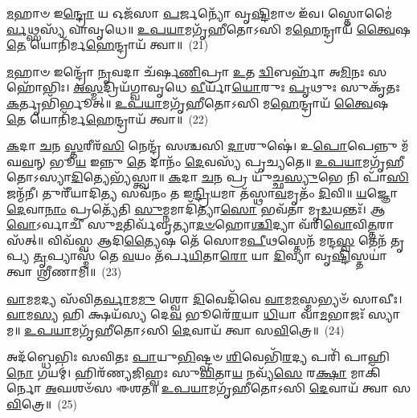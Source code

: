 \-\ul{𑌮}\-𑌹𑌾𑍞 𑌇\-\ul{𑌨𑍍𑌦𑍍𑌰𑍋} 𑌯 𑌓𑌜᳴𑌸𑌾 \ul{𑌪}\-𑌰𑍍𑌜𑌨𑍍𑌯𑍋᳴ 𑌵𑍃\-\ul{𑌷𑍍𑌟𑌿}\-𑌮𑌾𑍞 𑌇᳴𑌵। 𑌸𑍍𑌤𑍋𑌮𑍈॑\-\ul{𑌰𑍍𑌵}\-𑌥𑍍𑌸𑌸𑍍𑌯᳴ 𑌵𑌾𑌵𑍃𑌧𑍇॥ \ul{𑌉}\-\-\ul{𑌪}\-\-\ul{𑌯𑌾}\-𑌮𑌗𑍃᳴𑌹𑍀𑌤𑍋\-𑌽𑌸𑌿 𑌮\-\ul{𑌹𑍇}\-𑌨𑍍𑌦𑍍𑌰𑌾𑌯᳴ \ul{𑌤𑍍𑌵𑍈}\-𑌷 \ul{𑌤𑍇} 𑌯𑍋𑌨𑌿᳴𑌰𑍍𑌮\-\ul{𑌹𑍇}\-𑌨𑍍𑌦𑍍𑌰𑌾𑌯᳴ 𑌤𑍍𑌵𑌾॥~(21)

{\anuvakamend[{\-\ul{𑌮}\-𑌹𑌾𑌨𑍇\-\ul{𑌕𑌾}\-𑌨𑍍𑌨𑌵𑌿𑍞᳴𑌶𑌤𑌿𑌃}]}%

\-\ul{𑌮}\-𑌹𑌾𑍞 𑌇𑌨𑍍𑌦𑍍𑌰𑍋᳴ \ul{𑌨𑍃}\-𑌵𑌦𑌾 𑌚᳴𑌰𑍍\mbox{}𑌷\-\ul{𑌣𑌿}\-𑌪𑍍𑌰𑌾 \ul{𑌉}\-𑌤 \ul{𑌦𑍍𑌵𑌿}\-𑌬𑌰𑍍\mbox{}𑌹𑌾᳴ 𑌅\-\ul{𑌮𑌿}\-𑌨𑌃 𑌸𑌹𑍋᳴𑌭𑌿𑌃। \ul{𑌅}\-\-\ul{𑌸𑍍𑌮}\-𑌦𑍍𑌰𑌿𑌯᳴𑌗𑍍𑌵𑌾𑌵𑍃𑌧𑍇 \ul{𑌵𑍀}\-𑌰𑍍𑌯𑌾᳴\-\ul{𑌯𑍋}\-𑌰𑍁𑌃 \ul{𑌪𑍃}\-𑌥𑍁𑌃 𑌸𑍁𑌕𑍃᳴𑌤𑌃 \ul{𑌕}\-𑌰𑍍𑌤𑍃𑌭𑌿᳴𑌰𑍍𑌭𑍂𑌤𑍍॥ \ul{𑌉}\-\-\ul{𑌪}\-\-\ul{𑌯𑌾}\-𑌮𑌗𑍃᳴𑌹𑍀𑌤𑍋\-𑌽𑌸𑌿 𑌮\-\ul{𑌹𑍇}\-𑌨𑍍𑌦𑍍𑌰𑌾𑌯᳴ \ul{𑌤𑍍𑌵𑍈}\-𑌷 \ul{𑌤𑍇} 𑌯𑍋𑌨𑌿᳴𑌰𑍍𑌮\-\ul{𑌹𑍇}\-𑌨𑍍𑌦𑍍𑌰𑌾𑌯᳴ 𑌤𑍍𑌵𑌾॥~(22)

{\anuvakamend[{\-\ul{𑌮}\-𑌹𑌾\-\ul{𑌨𑍍𑌨𑍃}\-𑌵𑌤𑍍𑌷𑌡𑍍𑌵𑌿𑍞᳴𑌶𑌤𑌿𑌃}]}%

\-\ul{𑌕}\-𑌦𑌾 \ul{𑌚}\-𑌨 \ul{𑌸𑍍𑌤}\-𑌰𑍀𑌰᳴\-\ul{𑌸𑌿} 𑌨𑍇𑌨𑍍𑌦𑍍𑌰᳴ 𑌸𑌶𑍍𑌚𑌸𑌿 \ul{𑌦𑌾}\-𑌶𑍁𑌷𑍇॑। 𑌉\-\ul{𑌪𑍋}\-𑌪𑍇𑌨𑍍𑌨𑍁 𑌮᳴𑌘\-\ul{𑌵}\-𑌨𑍍 𑌭𑍂\-\ul{𑌯} 𑌇𑌨𑍍𑌨𑍁 \ul{𑌤𑍇} 𑌦𑌾𑌨𑌂᳴ \ul{𑌦𑍇}\-𑌵𑌸𑍍𑌯᳴ 𑌪𑍃𑌚𑍍𑌯𑌤𑍇॥ \ul{𑌉}\-\-\ul{𑌪}\-\-\ul{𑌯𑌾}\-𑌮𑌗𑍃᳴𑌹𑍀𑌤𑍋\-𑌽𑌸𑍍𑌯𑌾\-\ul{𑌦𑌿}\-𑌤𑍍𑌯𑍇𑌭𑍍𑌯᳴𑌸𑍍𑌤𑍍𑌵𑌾॥ \ul{𑌕}\-𑌦𑌾 \ul{𑌚}\-𑌨 𑌪𑍍𑌰 𑌯𑍁᳴𑌚𑍍𑌛\-\ul{𑌸𑍍𑌯𑍁}\-𑌭𑍇 𑌨𑌿 𑌪𑌾᳴\-\ul{𑌸𑌿} 𑌜𑌨𑍍𑌮᳴𑌨𑍀। 𑌤𑍁𑌰𑍀᳴𑌯𑌾𑌦𑌿\-\ul{𑌤𑍍𑌯} 𑌸𑌵᳴𑌨𑌂 𑌤 𑌇\-\ul{𑌨𑍍𑌦𑍍𑌰𑌿}\-𑌯𑌮𑌾 𑌤᳴𑌸𑍍𑌥𑌾\-\ul{𑌵}\-𑌮𑍃𑌤𑌂᳴ \ul{𑌦𑌿}\-𑌵𑌿॥ \ul{𑌯}\-𑌜𑍍𑌞𑍋 \ul{𑌦𑍇}\-𑌵𑌾\-\ul{𑌨𑌾𑌂} 𑌪𑍍𑌰𑌤𑍍𑌯𑍇᳴𑌤𑌿 \ul{𑌸𑍁}\-𑌮𑍍𑌨𑌮𑌾𑌦𑌿᳴𑌤𑍍𑌯𑌾\-\ul{𑌸𑍋} 𑌭𑌵᳴𑌤𑌾 𑌮𑍃\-\ul{𑌡}\-𑌯𑌨𑍍𑌤𑌃᳴। 𑌆 \ul{𑌵𑍋}\-𑌽𑌰𑍍𑌵𑌾𑌚𑍀᳴ 𑌸𑍁\-\ul{𑌮}\-𑌤𑌿𑌰𑍍𑌵᳴𑌵𑍃𑌤𑍍𑌯𑌾\-\ul{𑌦}\-\-\ul{𑍞}\-𑌹𑍋\-\ul{𑌶𑍍𑌚𑌿}\-𑌦𑍍𑌯𑌾 𑌵᳴𑌰𑌿\-\ul{𑌵𑍋}\-𑌵𑌿\-\ul{𑌤𑍍𑌤}\-𑌰𑌾𑌸᳴𑌤𑍍॥ 𑌵𑌿𑌵᳴𑌸𑍍𑌵 𑌆𑌦𑌿\-\ul{𑌤𑍍𑌯𑍈}\-𑌷 𑌤𑍇᳴ 𑌸𑍋𑌮\-\ul{𑌪𑍀}\-𑌥𑌸𑍍𑌤𑍇𑌨᳴ 𑌮𑌨𑍍𑌦\-\ul{𑌸𑍍𑌵} 𑌤𑍇𑌨᳴ 𑌤𑍃𑌪𑍍𑌯 \ul{𑌤𑍃}\-𑌪𑍍𑌯𑌾𑌸𑍍𑌮᳴ 𑌤𑍇 \ul{𑌵}\-𑌯𑌂 𑌤᳴𑌰𑍍𑌪\-\ul{𑌯𑌿}\-𑌤𑌾\-\ul{𑌰𑍋} 𑌯𑌾 \ul{𑌦𑌿}\-𑌵𑍍𑌯𑌾 𑌵𑍃\-\ul{𑌷𑍍𑌟𑌿}\-𑌸𑍍𑌤𑌯𑌾॑ 𑌤𑍍𑌵𑌾 𑌶𑍍𑌰𑍀𑌣𑌾𑌮𑌿॥~(23)

{\anuvakamend[{\-\ul{𑌵𑌃} \ul{𑌸}\-𑌪𑍍𑌤𑌵𑌿𑍞᳴𑌶𑌤𑌿𑌶𑍍𑌚}]}%

\-\ul{𑌵𑌾}\-𑌮\-\ul{𑌮}\-𑌦𑍍𑌯 𑌸᳴𑌵𑌿𑌤\-\ul{𑌰𑍍𑌵𑌾}\-𑌮\-\ul{𑌮𑍁} 𑌶𑍍𑌵𑍋 \ul{𑌦𑌿}\-𑌵𑍇𑌦𑌿᳴𑌵𑍇 \ul{𑌵𑌾}\-𑌮\-\ul{𑌮}\-𑌸𑍍𑌮𑌭𑍍𑌯𑍞᳴ 𑌸𑌾𑌵𑍀𑌃। \ul{𑌵𑌾}\-𑌮\-\ul{𑌸𑍍𑌯} 𑌹𑌿 𑌕𑍍𑌷𑌯᳴𑌸𑍍𑌯 𑌦𑍇\-\ul{𑌵} 𑌭𑍂𑌰𑍇᳴\-\ul{𑌰}\-𑌯𑌾 \ul{𑌧𑌿}\-𑌯𑌾 𑌵𑌾᳴\-\ul{𑌮}\-𑌭𑌾𑌜𑌃᳴ 𑌸𑍍𑌯𑌾𑌮॥ \ul{𑌉}\-\-\ul{𑌪}\-\-\ul{𑌯𑌾}\-𑌮𑌗𑍃᳴𑌹𑍀𑌤𑍋\-𑌽𑌸𑌿 \ul{𑌦𑍇}\-𑌵𑌾𑌯᳴ 𑌤𑍍𑌵𑌾 𑌸\-\ul{𑌵𑌿}\-𑌤𑍍𑌰𑍇॥~(24)

{\anuvakamend[{\-\ul{𑌵𑌾}\-𑌮𑌂 𑌚𑌤𑍁᳴𑌰𑍍𑌵𑌿𑍞𑌶𑌤𑌿𑌃}]}%

𑌅𑌦᳴𑌬𑍍𑌧𑍇𑌭𑌿𑌃 𑌸𑌵𑌿𑌤𑌃 \ul{𑌪𑌾}\-𑌯𑍁\-\ul{𑌭𑌿}\-𑌷𑍍𑌟𑍍𑌵𑍞 \ul{𑌶𑌿}\-𑌵𑍇𑌭𑌿᳴\-\ul{𑌰}\-𑌦𑍍𑌯 𑌪𑌰𑌿᳴ 𑌪𑌾𑌹𑌿 \ul{𑌨𑍋} 𑌗𑌯𑌮𑍍॑। 𑌹𑌿𑌰᳴𑌣𑍍𑌯𑌜𑌿𑌹𑍍𑌵𑌃 𑌸𑍁\-\ul{𑌵𑌿}\-𑌤𑌾\-\ul{𑌯} 𑌨𑌵𑍍𑌯᳴\-\ul{𑌸𑍇} 𑌰\-\ul{𑌕𑍍𑌷𑌾} 𑌮𑌾𑌕𑌿᳴𑌰𑍍𑌨𑍋 \ul{𑌅}\-𑌘𑌶𑍞᳴𑌸 𑌈𑌶𑌤॥ \ul{𑌉}\-\-\ul{𑌪}\-\-\ul{𑌯𑌾}\-𑌮𑌗𑍃᳴𑌹𑍀𑌤𑍋\-𑌽𑌸𑌿 \ul{𑌦𑍇}\-𑌵𑌾𑌯᳴ 𑌤𑍍𑌵𑌾 𑌸\-\ul{𑌵𑌿}\-𑌤𑍍𑌰𑍇॥~(25)

